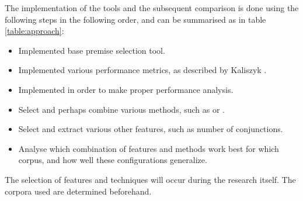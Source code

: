 The implementation of the tools and the subsequent comparison is done using the following steps in the following order, and can be summarised as in table \ref{table:approach}:
\begin{itemize}
	\item Implemented base premise selection tool.
	\item Implemented various performance metrics, as described by Kaliszyk \cite{kaliszyk2014machine}.
	\item Implemented \crossvalidation in order to make proper performance analysis.
    \item Select and perhaps combine various \machinelearning methods, such as \nb or \ensemble.
	\item Select and extract various other features, such as number of conjunctions.
    \item Analyse which combination of features and \machinelearning methods work best for which corpus, and how well these configurations generalize.
\end{itemize}

The selection of features and \machinelearning techniques will occur during the research itself.
The corpora used are determined beforehand.

